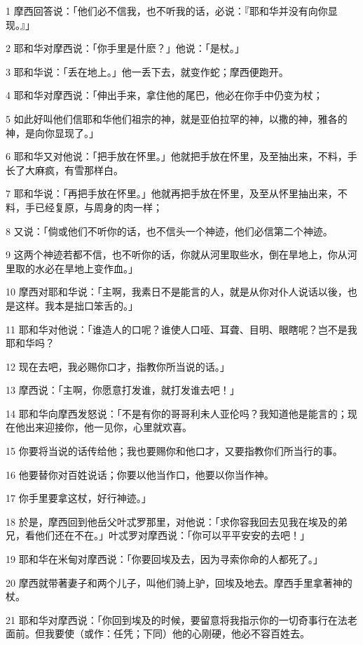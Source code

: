 \par 1 摩西回答说：「他们必不信我，也不听我的话，必说：『耶和华并没有向你显现。』」
\par 2 耶和华对摩西说：「你手里是什麽？」他说：「是杖。」
\par 3 耶和华说：「丢在地上。」他一丢下去，就变作蛇；摩西便跑开。
\par 4 耶和华对摩西说：「伸出手来，拿住他的尾巴，他必在你手中仍变为杖；
\par 5 如此好叫他们信耶和华他们祖宗的神，就是亚伯拉罕的神，以撒的神，雅各的神，是向你显现了。」
\par 6 耶和华又对他说：「把手放在怀里。」他就把手放在怀里，及至抽出来，不料，手长了大麻疯，有雪那样白。
\par 7 耶和华说：「再把手放在怀里。」他就再把手放在怀里，及至从怀里抽出来，不料，手已经复原，与周身的肉一样；
\par 8 又说：「倘或他们不听你的话，也不信头一个神迹，他们必信第二个神迹。
\par 9 这两个神迹若都不信，也不听你的话，你就从河里取些水，倒在旱地上，你从河里取的水必在旱地上变作血。」
\par 10 摩西对耶和华说：「主啊，我素日不是能言的人，就是从你对仆人说话以後，也是这样。我本是拙口笨舌的。」
\par 11 耶和华对他说：「谁造人的口呢？谁使人口哑、耳聋、目明、眼瞎呢？岂不是我耶和华吗？
\par 12 现在去吧，我必赐你口才，指教你所当说的话。」
\par 13 摩西说：「主啊，你愿意打发谁，就打发谁去吧！」
\par 14 耶和华向摩西发怒说：「不是有你的哥哥利未人亚伦吗？我知道他是能言的；现在他出来迎接你，他一见你，心里就欢喜。
\par 15 你要将当说的话传给他；我也要赐你和他口才，又要指教你们所当行的事。
\par 16 他要替你对百姓说话；你要以他当作口，他要以你当作神。
\par 17 你手里要拿这杖，好行神迹。」
\par 18 於是，摩西回到他岳父叶忒罗那里，对他说：「求你容我回去见我在埃及的弟兄，看他们还在不在。」叶忒罗对摩西说：「你可以平平安安的去吧！」
\par 19 耶和华在米甸对摩西说：「你要回埃及去，因为寻索你命的人都死了。」
\par 20 摩西就带著妻子和两个儿子，叫他们骑上驴，回埃及地去。摩西手里拿著神的杖。
\par 21 耶和华对摩西说：「你回到埃及的时候，要留意将我指示你的一切奇事行在法老面前。但我要使（或作：任凭；下同）他的心刚硬，他必不容百姓去。
